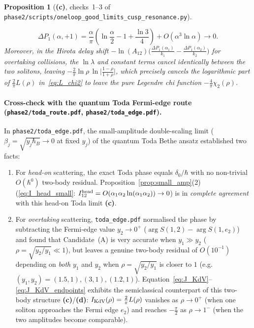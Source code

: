 \documentclass[11pt,a4paper]{article}
\newcommand{\Lc}{\textsf{\textbf{(c)}}}
\newcommand{\Ld}{\textsf{\textbf{(d)}}}
\newcommand{\script}[1]{\texttt{phase2/\allowbreak scripts/\allowbreak #1}}
\newtheorem{proposition}{Proposition}[section]
\theoremstyle{remark}
\begin{document}
\begin{proposition}[\Lc, checks~1--3 of \script{oneloop\_good\_limits\_cusp\_resonance.py}]
\begin{enumerate}
\begin{equation}\label{eq:DP1_small}
\Delta P_1(\alpha,+1)=\frac{\alpha}{\pi}\left(\ln\frac{\alpha}{2}-1+\frac{\ln 3}{4}\right)+O(\alpha^3\ln\alpha)\to 0.
\end{equation}
Moreover, in the Hirota delay shift $-\ln(A_{12})\big(\frac{\Delta P_1(\alpha_1)}{k_1}-\frac{\Delta P_1(\alpha_2)}{k_2}\big)$ for overtaking collisions, the $\ln\lambda$ and constant terms cancel identically between the two solitons, leaving $-\frac{2}{\pi}\ln\rho\,\ln\big|\frac{1-\rho}{1+\rho}\big|$, which precisely cancels the logarithmic part of $\frac{2}{\pi}L(\rho)$ in~\eqref{eq:L_chi2} to leave the pure Legendre chi function $-\frac{4}{\pi}\chi_2(\rho)$.
\end{enumerate}
\end{proposition}

\paragraph{Cross-check with the quantum Toda Fermi-edge route (\texttt{phase2/toda\_route.pdf}, \texttt{phase2/toda\_edge.pdf}).}
In \texttt{phase2/toda\_edge.pdf}, the small-amplitude double-scaling limit ($\beta_j=\sqrt{y_j\hbar_B}\to 0$ at fixed $y_j$) of the quantum Toda Bethe ansatz established two facts:
\begin{enumerate}
\item For \emph{head-on} scattering, the exact Toda phase equals $\delta_0/\hbar$ with no non-trivial $O(\hbar^0)$ two-body residual. Proposition~\ref{prop:small_amp}(2) (\eqref{eq:I_head_small}: $I_{12}^{\rm head}=O(\alpha_1\alpha_2\ln(\alpha_1\alpha_2))\to 0$) is in \emph{complete agreement} with this head-on Toda limit \Lc.
\item For \emph{overtaking} scattering, \texttt{toda\_edge.pdf} normalised the phase by subtracting the Fermi-edge value $y_2\to 0^+$ ($\arg S(1,2)-\arg S(1,e_2)$) and found that Candidate~(A) is very accurate when $y_1\gg y_2$ ($\rho=\sqrt{y_2/y_1}\ll 1$), but leaves a genuine two-body residual of $O(10^{-1})$ depending on \emph{both} $y_1$ and $y_2$ when $\rho=\sqrt{y_2/y_1}$ is closer to $1$ (e.g.\ $(y_1,y_2)=(1.5,1),(3,1),(1.2,1)$). Equation~\eqref{eq:J_KdV}--\eqref{eq:J_KdV_endpoints} exhibits the semiclassical counterpart of this two-body structure \Lc/\Ld: $I_{\rm KdV}(\rho)=\frac{2}{\pi}L(\rho)$ vanishes as $\rho\to 0^+$ (when one soliton approaches the Fermi edge $e_2$) and reaches $-\frac{\pi}{2}$ as $\rho\to 1^-$ (when the two amplitudes become comparable).
\end{enumerate}
\end{document}
